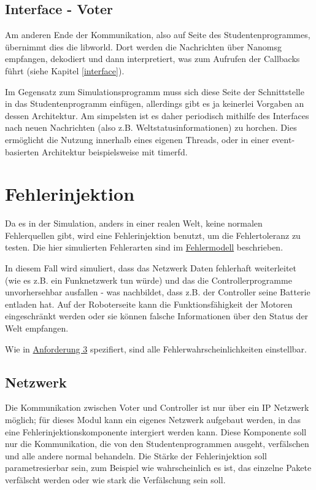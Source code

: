 \subsection{Interface - Voter}
Am anderen Ende der Kommunikation, also auf Seite des Studentenprogrammes, {\"{u}}bernimmt dies die libworld. Dort werden die
Nachrichten {\"{u}}ber Nanomsg empfangen, dekodiert und dann interpretiert, was zum Aufrufen der Callbacks f{\"{u}}hrt
(siehe Kapitel \ref{interface}).

Im Gegensatz zum Simulationsprogramm muss sich diese Seite der Schnittstelle in das Studentenprogramm einf{\"{u}}gen, allerdings
gibt es ja keinerlei Vorgaben an dessen Architektur. Am simpelsten ist es daher periodisch
mithilfe des Interfaces nach neuen Nachrichten (also z.B. Weltstatusinformationen) zu horchen. Dies erm{\"{o}}glicht die Nutzung
innerhalb eines eigenen Threads, oder in einer event-basierten Architektur beispielsweise mit timerfd.

\clearpage
\section{Fehlerinjektion}
Da es in der Simulation, anders in einer realen Welt, keine normalen Fehlerquellen gibt, wird eine
Fehlerinjektion benutzt, um die Fehlertoleranz zu testen. Die hier simulierten Fehlerarten 
sind im \hyperref[fm]{Fehlermodell} beschrieben.

In diesem Fall wird simuliert, dass das Netzwerk Daten fehlerhaft weiterleitet
(wie es z.B. ein Funknetzwerk tun w{\"{u}}rde) und das die Controllerprogramme unvorhersehbar
ausfallen - was nachbildet, dass z.B. der Controller seine Batterie entladen hat. Auf der Roboterseite
kann die Funktionsf{\"{a}}higkeit der Motoren eingeschr{\"{a}}nkt werden oder sie k{\"{o}}nnen
falsche Informationen {\"{u}}ber den Status der Welt empfangen.

Wie in \hyperref[anforderung]{Anforderung 3} spezifiert, sind alle Fehlerwahrscheinlichkeiten einstellbar.

\subsection{Netzwerk}
Die Kommunikation zwischen Voter und Controller ist nur {\"{u}}ber ein IP Netzwerk m{\"{o}}glich;
f{\"{u}}r dieses Modul kann ein eigenes Netzwerk aufgebaut werden, in das eine Fehlerinjektionskomponente 
intergiert werden kann. Diese Komponente soll nur die Kommunikation, die von den Studentenprogrammen ausgeht, 
verf{\"{a}}lschen und alle andere normal behandeln. Die St{\"{a}}rke der Fehlerinjektion soll parametresierbar 
sein, zum Beispiel wie wahrscheinlich es ist, das einzelne Pakete verf{\"{a}}lscht werden oder wie stark
die Verf{\"{a}}lschung sein soll.

